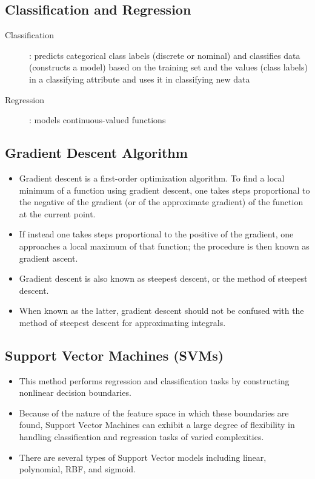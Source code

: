 \documentclass[12pt]{article}
\begin{document}
\subsection{Classification and Regression}

\begin{description}
\item[Classification]:  
predicts categorical class labels (discrete or nominal) and
classifies data (constructs a model) based on the training set and the values (class labels) in a classifying attribute and uses it in classifying new data
\item[Regression]:  
models continuous-valued functions
\end{description}
\newpage
\subsection{Gradient Descent Algorithm}

\begin{itemize}
\item Gradient descent is a first-order optimization algorithm. To find a local minimum of a function using gradient descent, one takes steps proportional to the negative of the gradient (or of the approximate gradient) of the function at the current point.\item  If instead one takes steps proportional to the positive of the gradient, one approaches a local maximum of that function; the procedure is then known as gradient ascent.
\item Gradient descent is also known as steepest descent, or the method of steepest descent. \item When known as the latter, gradient descent should not be confused with the method of steepest descent for approximating integrals.
\end{itemize}

\subsection{Support Vector Machines (SVMs)}
\begin{itemize}
 
\item This method performs regression and classification tasks by constructing nonlinear decision boundaries. \item Because of the nature of the feature space in which these boundaries are found, Support Vector Machines can exhibit a large degree of flexibility in handling classification and regression tasks of varied complexities. \item There are several types of Support Vector models including linear, polynomial, RBF, and sigmoid.

\end{itemize}
\end{document}
